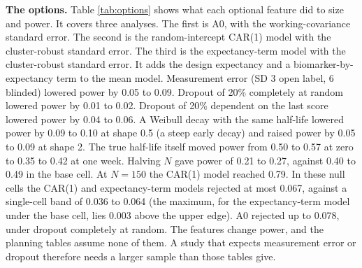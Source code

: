 \documentclass[
  11pt,
]{article}
\newcounter{none} %
\begin{document}
\textbf{The options.} Table \ref{tab:options} shows what each optional
feature did to size and power. It covers three analyses. The first is
A0, with the working-covariance standard error. The second is the
random-intercept CAR(1) model with the
cluster-robust standard error. The third is the expectancy-term model
with the cluster-robust standard error. It adds the design expectancy
and a biomarker-by-expectancy term to the mean model. Measurement
error (SD 3 open label, 6 blinded) lowered power by 0.05 to 0.09. Dropout
of 20\% completely at random lowered power by 0.01 to 0.02. Dropout of
20\% dependent on the last score lowered power by 0.04 to 0.06. A Weibull
decay with the same half-life lowered power by 0.09 to 0.10 at shape 0.5
(a steep early decay) and raised power by 0.05 to 0.09 at shape 2. The true
half-life itself moved power from 0.50 to 0.57 at
zero to 0.35 to 0.42 at one week. Halving \(N\) gave
power of 0.21 to 0.27, against
0.40 to 0.49 in the base cell. At \(N = 150\) the
CAR(1) model reached 0.79. In these
null cells the CAR(1) and expectancy-term models rejected at most
0.067, against a single-cell band of
0.036 to 0.064 (the maximum, for the expectancy-term model under the base cell, lies 0.003 above the upper edge).
A0 rejected up to 0.078, under
dropout completely at random. The features change power, and the planning tables
assume none of them. A study that expects measurement error or
dropout therefore needs a larger sample than those tables give.
\end{document}
